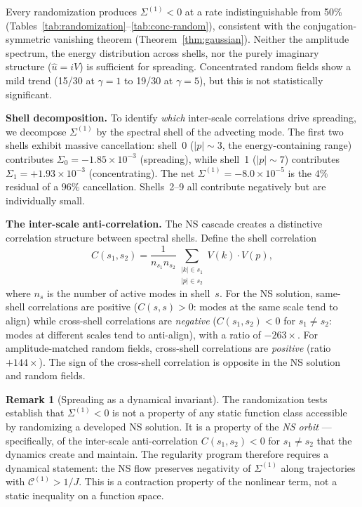 \documentclass[11pt]{article}
\theoremstyle{definition}
\newtheorem{remark}[theorem]{Remark}
\newcommand{\cC}{\mathcal{C}}
\begin{document}
Every randomization produces $\Sigma^{(1)}<0$
at a rate indistinguishable from 50\%
(Tables~\ref{tab:randomization}--\ref{tab:conc-random}),
consistent with the
conjugation-symmetric vanishing theorem
(Theorem~\ref{thm:gaussian}).
Neither the amplitude spectrum, the energy
distribution across shells, nor the purely
imaginary structure ($\hat u = iV$) is sufficient
for spreading.  Concentrated random fields show a
mild trend (15/30 at $\gamma=1$ to 19/30 at
$\gamma=5$), but this is not statistically
significant.

\medskip\noindent\textbf{Shell decomposition.}
To identify \emph{which} inter-scale correlations
drive spreading, we decompose $\Sigma^{(1)}$ by
the spectral shell of the advecting mode.  The
first two shells exhibit massive cancellation:
shell~0 ($|p|\sim 3$, the energy-containing range)
contributes $\Sigma_0 = -1.85\times 10^{-3}$
(spreading), while shell~1 ($|p|\sim 7$) contributes
$\Sigma_1 = +1.93\times 10^{-3}$ (concentrating).
The net $\Sigma^{(1)} = -8.0\times 10^{-5}$ is
the $4\%$ residual of a $96\%$ cancellation.
Shells~2--9 all contribute negatively but are
individually small.

\medskip\noindent\textbf{The inter-scale
anti-correlation.}
The NS cascade creates a distinctive correlation
structure between spectral shells.  Define the
shell correlation
\begin{equation}
C(s_1,s_2) = \frac{1}{n_{s_1}n_{s_2}}
\sum_{\substack{|k|\in s_1\\|p|\in s_2}}
V(k)\cdot V(p),
\end{equation}
where $n_s$ is the number of active modes in
shell~$s$.  For the NS solution, same-shell
correlations are positive ($C(s,s)>0$: modes at
the same scale tend to align) while cross-shell
correlations are \emph{negative}
($C(s_1,s_2)<0$ for $s_1\neq s_2$: modes at
different scales tend to anti-align), with a
ratio of $-263\times$.  For amplitude-matched
random fields, cross-shell correlations are
\emph{positive} (ratio $+144\times$).  The sign
of the cross-shell correlation is opposite in
the NS solution and random fields.

\begin{remark}[Spreading as a dynamical invariant]
\label{rem:dynamical}
The randomization tests establish that
$\Sigma^{(1)}<0$ is not a property of any static
function class accessible by randomizing a
developed NS solution.  It is a property of the
\emph{NS orbit} --- specifically, of the
inter-scale anti-correlation
$C(s_1,s_2)<0$ for $s_1\neq s_2$ that the
dynamics create and maintain.  The regularity
program therefore requires a dynamical statement:
the NS flow preserves negativity of
$\Sigma^{(1)}$ along trajectories with
$\cC^{(1)}>1/J$.  This is a contraction property
of the nonlinear term, not a static inequality on
a function space.
\end{remark}
\end{document}
